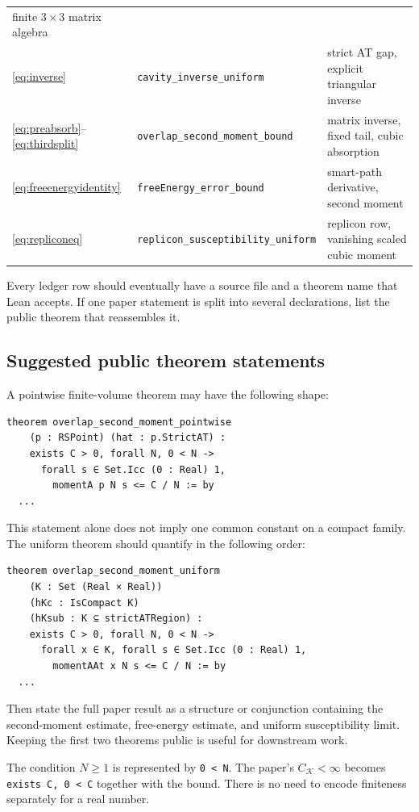 \documentclass[11pt]{article}
\numberwithin{equation}{section}
\newcommand{\1}{\mathbf 1}
\begin{document}
\begin{center}
\begin{tabular}{p{}p{}p{}}
finite $3\times3$ matrix algebra\\
\eqref{eq:inverse} &
\texttt{cavity\_inverse\_uniform} &
strict AT gap, explicit triangular inverse\\
\eqref{eq:preabsorb}--\eqref{eq:thirdsplit} &
\texttt{overlap\_second\_moment\_bound} &
matrix inverse, fixed tail, cubic absorption\\
\eqref{eq:freeenergyidentity} &
\texttt{freeEnergy\_error\_bound} &
smart-path derivative, second moment\\
\eqref{eq:repliconeq} &
\texttt{replicon\_susceptibility\_uniform} &
replicon row, vanishing scaled cubic moment\\
\bottomrule
\end{tabular}
\end{center}

Every ledger row should eventually have a source file and a theorem name
that Lean accepts.  If one paper statement is split into several
declarations, list the public theorem that reassembles it.

\subsection{Suggested public theorem statements}

A pointwise finite-volume theorem may have the following shape:
\begin{lstlisting}
theorem overlap_second_moment_pointwise
    (p : RSPoint) (hat : p.StrictAT) :
    exists C > 0, forall N, 0 < N ->
      forall s ∈ Set.Icc (0 : Real) 1,
        momentA p N s <= C / N := by
  ...
\end{lstlisting}
This statement alone does not imply one common constant on a compact family.
The uniform theorem should quantify in the following order:
\begin{lstlisting}
theorem overlap_second_moment_uniform
    (K : Set (Real × Real))
    (hKc : IsCompact K)
    (hKsub : K ⊆ strictATRegion) :
    exists C > 0, forall N, 0 < N ->
      forall x ∈ K, forall s ∈ Set.Icc (0 : Real) 1,
        momentAAt x N s <= C / N := by
  ...
\end{lstlisting}
Then state the full paper result as a structure or conjunction containing the
second-moment estimate, free-energy estimate, and uniform susceptibility
limit.  Keeping the first two theorems public is useful for downstream work.

The condition $N\ge1$ is represented by \texttt{0 < N}.  The paper's
$C_{\mathcal K}<\infty$ becomes \texttt{exists C, 0 < C} together with the
bound.  There is no need to encode finiteness separately for a real number.
\end{document}
